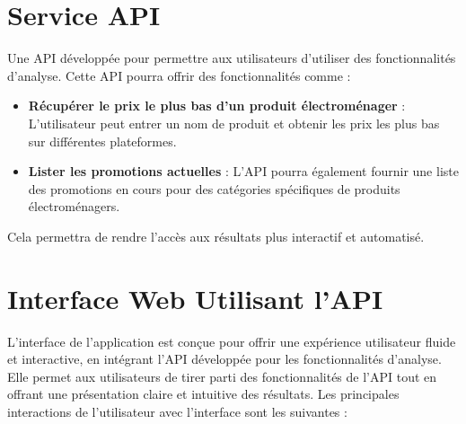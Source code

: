 \documentclass[a4paper, 12pt, oneside]{report}
\begin{document}
\section{Service API}
Une API développée pour permettre aux utilisateurs d'utiliser des fonctionnalités d'analyse. Cette API pourra offrir des fonctionnalités comme :
\begin{itemize}
    \item \textbf{Récupérer le prix le plus bas d’un produit électroménager} : L'utilisateur peut entrer un nom de produit et obtenir les prix les plus bas sur différentes plateformes.
    \item \textbf{Lister les promotions actuelles} : L'API pourra également fournir une liste des promotions en cours pour des catégories spécifiques de produits électroménagers.
\end{itemize}

Cela permettra de rendre l'accès aux résultats plus interactif et automatisé.

\section{Interface Web Utilisant l'API}

L'interface de l'application est conçue pour offrir une expérience utilisateur fluide et interactive, en intégrant l'API développée pour les fonctionnalités d'analyse. Elle permet aux utilisateurs de tirer parti des fonctionnalités de l'API tout en offrant une présentation claire et intuitive des résultats. Les principales interactions de l'utilisateur avec l'interface sont les suivantes :
\end{document}
